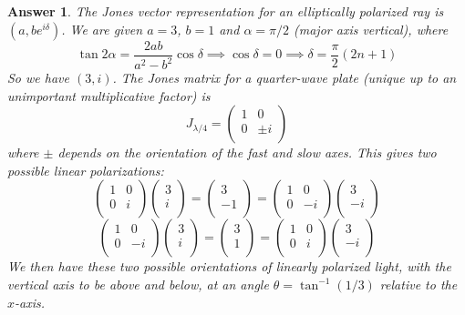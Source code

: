 \documentclass[a4paper]{article}
\newtheorem{ans}{Answer}
\theoremstyle{new}
\begin{document}
\begin{ans}
The Jones vector representation for an elliptically polarized ray is $(a,be^{i\delta})$. We are given $a=3$, $b=1$ and $\alpha=\pi/2$ (major axis vertical), where
$$\tan2\alpha=\frac{2ab}{a^2-b^2}\cos\delta\implies\cos\delta=0\implies\delta=\frac{\pi}{2}(2n+1)$$
So we have $(3,i)$. The Jones matrix for a quarter-wave plate (unique up to an unimportant multiplicative factor) is
$$J_{\lambda/4}=\begin{pmatrix}1&0\\0&\pm i\\\end{pmatrix}$$
where $\pm$ depends on the orientation of the fast and slow axes. This gives two possible linear polarizations:
$$\begin{pmatrix}1&0\\0&i\\\end{pmatrix}\begin{pmatrix}3\\i\\\end{pmatrix}=\begin{pmatrix}3\\-1\\\end{pmatrix}=\begin{pmatrix}1&0\\0&-i\\\end{pmatrix}\begin{pmatrix}3\\-i\\\end{pmatrix}$$
$$\begin{pmatrix}1&0\\0&-i\\\end{pmatrix}\begin{pmatrix}3\\i\\\end{pmatrix}=\begin{pmatrix}3\\1\\\end{pmatrix}=\begin{pmatrix}1&0\\0&i\\\end{pmatrix}\begin{pmatrix}3\\-i\\\end{pmatrix}$$
We then have these two possible orientations of linearly polarized light, with the vertical axis to be above and below, at an angle $\theta=\tan^{-1}(1/3)$ relative to the $x$-axis.
\end{ans}
\end{document}
